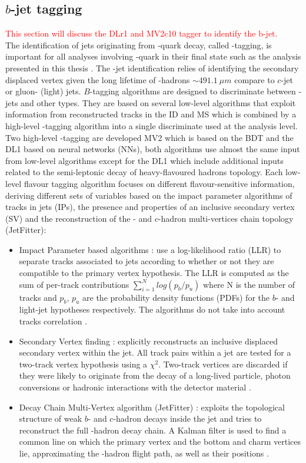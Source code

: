 \subsection{$b$-jet tagging}
\label{Jet:Tag:Dlr}
\textcolor{red}{This section will discuss the DLr1 and MV2c10 tagger to identify the b-jet. \\}
The identification of jets originating from \bq-quark decay, called \bq-tagging, is important for all analyses involving \bq-quark in their final state such as the analysis presented in this thesis \HHyybb. The \bq-jet identification relies of identifying the secondary displaced vertex given the long lifetime of \bq-hadrons $\sim 491.1 \ \mu m$ compare to $c$-jet or gluon- (light) jets. $B$-tagging algorithms are designed to discriminate between \bq-jets and other types. They are based on several low-level algorithms that exploit information from reconstructed tracks in the ID and MS which is combined by a high-level \bq-tagging algorithm into a single discriminate used at the analysis level. Two high-level \bq-tagging are developed MV2 which is based on the BDT and the DL1 based on neural networks (NNs), both algorithms use almost the same input from low-level algorithms except for the DL1 which include additional inputs related to the semi-leptonic decay of heavy-flavoured hadrons topology. Each low-level flavour tagging algorithm focuses on different flavour-sensitive information, deriving different sets of variables based on the impact parameter algorithms of tracks in jets (IPs), the presence and properties of an inclusive secondary vertex (SV) and the reconstruction of the \bq- and $c$-hadron multi-vertices chain topology (JetFitter): 
\begin{itemize}
    \item Impact Parameter based algorithms : use a log-likelihood ratio (LLR) to separate tracks associated to jets according to whether or not they are compatible to the primary vertex hypothesis. The LLR is computed as the sum of per-track contributions $\sum_{i=1}^{N}log(p_b/p_u)$ where N is the number of tracks and $p_b$, $p_u$ are the probability density functions (PDFs) for the $b$- and light-jet hypotheses respectively. The algorithms do not take into account tracks correlation \cite{IP,IP2}. 
    \item Secondary Vertex finding : explicitly reconstructs an inclusive displaced secondary vertex within the jet. All track pairs within a jet are tested for a two-track vertex hypothesis using a $\chi^2$. Two-track vertices are discarded if they were likely to originate from the decay of a long-lived particle, photon conversions or hadronic interactions with the detector material \cite{SV}.
    \item Decay Chain Multi-Vertex algorithm (JetFitter) : exploits the topological structure of weak $b$- and $c$-hadron decays inside the jet and tries to reconstruct the full \bq-hadron decay chain. A Kalman filter is used to find a common line on which the primary vertex and the bottom and charm vertices lie, approximating the \bq-hadron flight path, as well as their positions \cite{JetFitter}.
\end{itemize}
